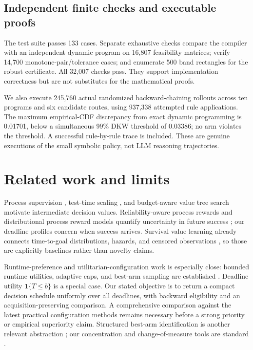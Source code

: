 \documentclass[11pt]{article}
\theoremstyle{definition}\newtheorem{definition}[theorem]{Definition}
\newcommand{\ind}{\mathbf{1}}
\begin{document}
\subsection{Independent finite checks and executable proofs}
The test suite passes 133 cases. Separate exhaustive checks compare the compiler with an independent dynamic program on 16,807 feasibility matrices; verify 14,700 monotone-pair/tolerance cases; and enumerate 500 band rectangles for the robust certificate. All 32,007 checks pass. They support implementation correctness but are not substitutes for the mathematical proofs.

We also execute 245,760 actual randomized backward-chaining rollouts across ten programs and six candidate routes, using 937,338 attempted rule applications. The maximum empirical-CDF discrepancy from exact dynamic programming is 0.01701, below a simultaneous 99\% DKW threshold of 0.03386; no arm violates the threshold. A successful rule-by-rule trace is included. These are genuine executions of the small symbolic policy, not LLM reasoning trajectories.

\section{Related work and limits}
Process supervision \citep{lightman2023}, test-time scaling \citep{snell2024}, and budget-aware value tree search \citep{li2026budget} motivate intermediate decision values. Reliability-aware process rewards and distributional process reward models quantify uncertainty in future success \citep{li2026reliability,ma2026distributional}; our deadline profiles concern when success arrives. Survival value learning already connects time-to-goal distributions, hazards, and censored observations \citep{tiofack2026}, so those are explicitly baselines rather than novelty claims.

Runtime-preference and utilitarian-configuration work is especially close: bounded runtime utilities, adaptive caps, and best-arm sampling are established \citep{graham2023preferences,graham2023utilitarian,graham2025practical}. Deadline utility $\ind\{T\le b\}$ is a special case. Our stated objective is to return a compact decision schedule uniformly over all deadlines, with backward eligibility and an acquisition-preserving comparison. A comprehensive comparison against the latest practical configuration methods remains necessary before a strong priority or empirical superiority claim. Structured best-arm identification is another relevant abstraction \citep{huang2017}; our concentration and change-of-measure tools are standard \citep{massart1990,kaufmann2016}.
\end{document}
